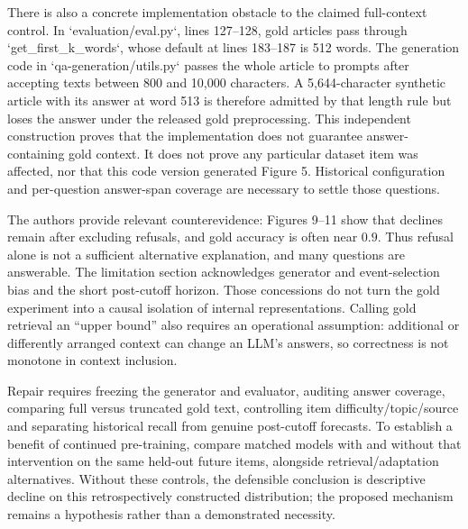 \documentclass[10pt]{article}
\begin{document}
There is also a concrete implementation obstacle to the claimed full-context control. In `evaluation/eval.py`, lines 127–128, gold articles pass through `get\_first\_k\_words`, whose default at lines 183–187 is 512 words. The generation code in `qa-generation/utils.py` passes the whole article to prompts after accepting texts between 800 and 10,000 characters. A 5,644-character synthetic article with its answer at word 513 is therefore admitted by that length rule but loses the answer under the released gold preprocessing. This independent construction proves that the implementation does not guarantee answer-containing gold context. It does not prove any particular dataset item was affected, nor that this code version generated Figure 5. Historical configuration and per-question answer-span coverage are necessary to settle those questions.\par
The authors provide relevant counterevidence: Figures 9–11 show that declines remain after excluding refusals, and gold accuracy is often near \(0.9\). Thus refusal alone is not a sufficient alternative explanation, and many questions are answerable. The limitation section acknowledges generator and event-selection bias and the short post-cutoff horizon. Those concessions do not turn the gold experiment into a causal isolation of internal representations. Calling gold retrieval an “upper bound” also requires an operational assumption: additional or differently arranged context can change an LLM’s answers, so correctness is not monotone in context inclusion.\par
Repair requires freezing the generator and evaluator, auditing answer coverage, comparing full versus truncated gold text, controlling item difficulty/topic/source and separating historical recall from genuine post-cutoff forecasts. To establish a benefit of continued pre-training, compare matched models with and without that intervention on the same held-out future items, alongside retrieval/adaptation alternatives. Without these controls, the defensible conclusion is descriptive decline on this retrospectively constructed distribution; the proposed mechanism remains a hypothesis rather than a demonstrated necessity.\par
\end{document}
